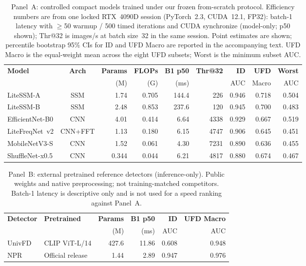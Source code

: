 \begin{table}[H]
\caption{Panel~A: controlled compact models trained under our frozen from-scratch protocol.
Efficiency numbers are from one locked RTX~4090D session (PyTorch~2.3, CUDA~12.1, FP32): batch-1 latency with $\ge$50 warmup / 500 timed iterations and CUDA synchronize (model-only; p50 shown); Thr@32 is images/s at batch size~32 in the same session.
Point estimates are shown; percentile bootstrap 95\% CIs for ID and UFD Macro are reported in the accompanying text.
UFD Macro is the equal-weight mean across the eight UFD subsets; Worst is the minimum subset AUC.\label{tab:overall}}
\footnotesize
\setlength{\tabcolsep}{2.5pt}
\begin{tabularx}{\textwidth}{@{}P{2.15cm}c*{7}{R}@{}}
\toprule
\textbf{Model} & \textbf{Arch} & \textbf{Params} & \textbf{FLOPs} & \textbf{B1 p50} & \textbf{Thr@32} & \textbf{ID} & \textbf{UFD} & \textbf{Worst} \\
 &  & (M) & (G) & (ms) &  & AUC & Macro & AUC \\
\midrule
LiteSSM-A & SSM & 1.74 & 0.705 & 144.4 & 226 & 0.946 & 0.718 & 0.504 \\
LiteSSM-B & SSM & 2.48 & 0.853 & 237.6 & 120 & 0.945 & 0.700 & 0.483 \\
EfficientNet-B0 & CNN & 4.01 & 0.414 & 6.64 & 4338 & 0.929 & 0.667 & 0.519 \\
LiteFreqNet~v2 & CNN+FFT & 1.13 & 0.180 & 6.15 & 4747 & 0.906 & 0.645 & 0.451 \\
MobileNetV3-S & CNN & 1.52 & 0.061 & 4.30 & 7231 & 0.890 & 0.636 & 0.455 \\
ShuffleNet-x0.5 & CNN & 0.344 & 0.044 & 6.21 & 4817 & 0.880 & 0.674 & 0.467 \\
\bottomrule
\end{tabularx}
\end{table}

\begin{table}[H]
\caption{Panel~B: external pretrained reference detectors (inference-only).
Public weights and native preprocessing; not training-matched competitors.
Batch-1 latency is descriptive only and is not used for a speed ranking against Panel~A.\label{tab:external}}
\footnotesize
\setlength{\tabcolsep}{4pt}
\begin{tabularx}{\textwidth}{@{}P{1.7cm}L*{4}{R}@{}}
\toprule
\textbf{Detector} & \textbf{Pretrained} & \textbf{Params} & \textbf{B1 p50} & \textbf{ID} & \textbf{UFD Macro} \\
 &  & (M) & (ms) & AUC & AUC \\
\midrule
UnivFD~\cite{ojha2023ufd} & CLIP ViT-L/14 & 427.6 & 11.86 & 0.608 & 0.948 \\
NPR~\cite{tan2024npr} & Official release & 1.44 & 2.89 & 0.947 & 0.976 \\
\bottomrule
\end{tabularx}
\end{table}

